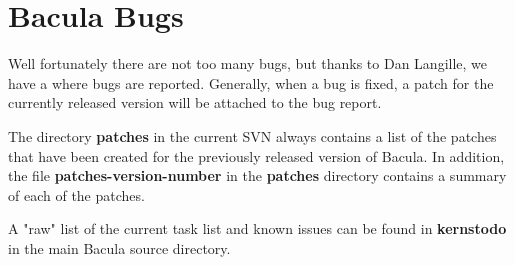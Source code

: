 
\section{Bacula Bugs}
\label{BugsChapter}

Well fortunately there are not too many bugs, but thanks to Dan Langille, we
have a 
 where bugs are reported.
Generally, when a bug is fixed, a patch for the currently released version will
be attached to the bug report.

The directory {\bf patches} in the current SVN always contains a list of 
the patches that have been created for the previously released version
of Bacula. In addition, the file {\bf patches-version-number} in the 
{\bf patches} directory contains a summary of each of the patches.

A "raw" list of the current task list and known issues can be found in {\bf
kernstodo} in the main Bacula source directory. 
